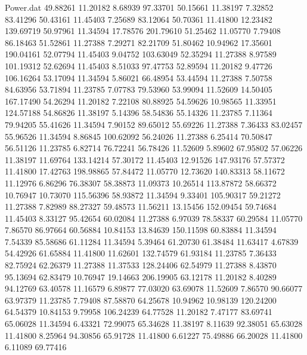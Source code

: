 \begin{filecontents}{Power.dat}
  49.88261   11.20182    8.68939   97.33701
  50.15661   11.38197    7.32852   83.41296
  50.43161   11.45403    7.25689   83.12064
  50.70361   11.41800   12.23482  139.69719
  50.97961   11.34594   17.78576  201.79610
  51.25462   11.05770    7.79408   86.18463
  51.52861   11.27388    7.29271   82.21709
  51.80462   10.94962   17.35601  190.04161
  52.07794   11.45403    9.04752  103.63049
  52.35294   11.27388    8.97589  101.19312
  52.62694   11.45403    8.51033   97.47753
  52.89594   11.20182    9.47726  106.16264
  53.17094   11.34594    5.86021   66.48954
  53.44594   11.27388    7.50758   84.63956
  53.71894   11.23785    7.07783   79.53960
  53.99094   11.52609   14.50405  167.17490
  54.26294   11.20182    7.22108   80.88925
  54.59626   10.98565   11.33951  124.57188
  54.86826   11.38197    5.14396   58.54836
  55.14326   11.23785    7.11364   79.94205
  55.41626   11.34594    7.90152   89.65012
  55.69226   11.27388    7.36433   83.02457
  55.96526   11.34594    8.86845  100.62092
  56.24026   11.27388    6.25414   70.50847
  56.51126   11.23785    6.82714   76.72241
  56.78426   11.52609    5.89602   67.95802
  57.06226   11.38197   11.69764  133.14214
  57.30172   11.45403   12.91526  147.93176
  57.57372   11.41800   17.42763  198.98865
  57.84472   11.05770   12.73620  140.83313
  58.11672   11.12976    6.86296   76.38307
  58.38873   11.09373   10.26514  113.87872
  58.66372   10.76947   10.73070  115.56396
  58.93872   11.34594    9.33401  105.90317
  59.21272   11.27388    7.82989   88.27327
  59.48573   11.56211   13.15456  152.09454
  59.74684   11.45403    8.33127   95.42654
  60.02084   11.27388    6.97039   78.58337
  60.29584   11.05770    7.86570   86.97664
  60.56884   10.84153   13.84639  150.11598
  60.83884   11.34594    7.54339   85.58686
  61.11284   11.34594    5.39464   61.20730
  61.38484   11.63417    4.67839   54.42926
  61.65884   11.41800   11.62601  132.74579
  61.93184   11.23785    7.36433   82.75924
  62.26379   11.27388   11.37533  128.24406
  62.54979   11.27388    8.43870   95.13694
  62.83479   10.76947   19.14663  206.19905
  63.12178   11.20182    8.40289   94.12769
  63.40578   11.16579    6.89877   77.03020
  63.69078   11.52609    7.86570   90.66077
  63.97379   11.23785    7.79408   87.58870
  64.25678   10.94962   10.98139  120.24200
  64.54379   10.84153    9.79958  106.24239
  64.77528   11.20182    7.47177   83.69741
  65.06028   11.34594    6.43321   72.99075
  65.34628   11.38197    8.11639   92.38051
  65.63028   11.41800    8.25964   94.30856
  65.91728   11.41800    6.61227   75.49886
  66.20028   11.41800    6.11089   69.77416

\end{filecontents}
